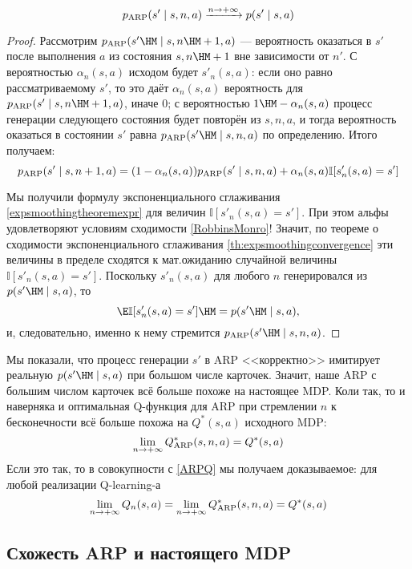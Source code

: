 \begin{theorem}\,
\begin{equation}\label{arptranslimit}
p_{\mathrm{ARP}}(s' \mid s, n, a) \xrightarrow{ n \to +\infty } p(s' \mid s, a)
\end{equation}
\begin{proof}
Рассмотрим $p_{\ARP}(s' \HM\mid s, n \HM+ 1, a)$ --- вероятность оказаться в $s'$ после выполнения $a$ из состояния $s, n \HM+ 1$ вне зависимости от $n'$. С вероятностью $\alpha_{n}(s, a)$ исходом будет $s'_n(s, a)$: если оно равно рассматриваемому $s'$, то это даёт $\alpha_n(s, a)$ вероятность для $p_{\ARP}(s' \mid s, n \HM+ 1, a)$, иначе 0; с вероятностью $1 \HM- \alpha_{n}(s, a)$ процесс генерации следующего состояния будет повторён из $s, n, a$, и тогда вероятность оказаться в состоянии $s'$ равна $p_{\ARP}(s' \HM\mid s, n, a)$ по определению. Итого получаем:
$$p_{\mathrm{ARP}}(s' \mid s, n + 1, a) = (1 - \alpha_{n}(s, a))p_{\mathrm{ARP}}(s' \mid s, n, a) + \alpha_{n}(s, a) \mathbb{I}[s'_n(s, a) = s']$$

Мы получили формулу экспоненциального сглаживания \eqref{expsmoothingtheoremexpr} для величин $\mathbb{I}[s'_n(s, a) = s']$. При этом альфы удовлетворяют условиям сходимости \eqref{RobbinsMonro}! Значит, по теореме о сходимости экспоненциального сглаживания \ref{th:expsmoothingconvergence} эти величины в пределе сходятся к мат.ожиданию случайной величины $\mathbb{I}[s'_n(s, a) = s']$. Поскольку $s'_n(s, a)$ для любого $n$ генерировался из $p(s' \HM\mid s, a)$, то 
$$\E \mathbb{I}[s'_n(s, a) = s'] \HM= p(s' \HM\mid s, a),$$
и, следовательно, именно к нему стремится $p_{\ARP}(s' \HM\mid s, n, a)$.
\end{proof}
\end{theorem}

Мы показали, что процесс генерации $s'$ в ARP <<корректно>> имитирует реальную $p(s' \HM\mid s, a)$ при большом числе карточек. Значит, наше ARP с большим числом карточек всё больше похоже на настоящее MDP. Коли так, то и наверняка и оптимальная Q-функция для ARP при стремлении $n$ к бесконечности всё больше похожа на $Q^*(s, a)$ исходного MDP:
$$\lim_{n \to +\infty} Q_{\mathrm{ARP}}^*(s, n, a) = Q^*(s, a)$$
Если это так, то в совокупности с \eqref{ARPQ} мы получаем доказываемое: для любой реализации Q-learning-а 
$$\lim_{n \to +\infty} Q_n(s, a) = \lim_{n \to +\infty} Q_{\mathrm{ARP}}^*(s, n, a) = Q^*(s, a)$$

\subsection{Схожесть ARP и настоящего MDP}

